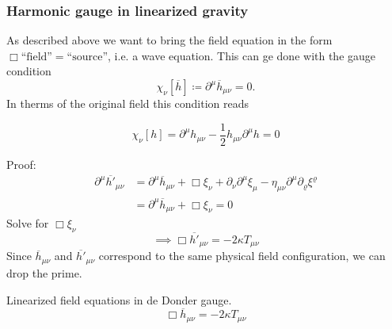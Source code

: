 \subsubsection{Harmonic gauge in linearized gravity}
As described above we want to bring the field equation in the form
$\Box\text{``field''}=\text{``source''}$, i.e. a wave equation.
This can ge done with the gauge condition
\begin{equation}
    \chi_\nu \left[ \overline{h} \right] \coloneqq \partial^\mu \overline{h}_{\mu\nu} = 0.
\end{equation}
In therms of the original field this condition reads
\begin{definition}
    \begin{equation}
        \chi_\nu \left[ h \right] = \partial^\mu h_{\mu\nu} - \frac{1}{2} h_{\mu\nu} \partial^\mu h = 0
    \end{equation}
\end{definition}
Proof:
\begin{equation}
    \begin{split}
        \partial^\mu \overline{h'}_{\mu\nu} &= \partial^\mu \overline{h}_{\mu\nu} + \Box \xi_\nu + \partial_\nu \partial^\mu \xi_\mu -
        \eta_{\mu\nu} \partial^\mu\partial_\varrho\xi^\varrho \\
        &= \partial^\mu \overline{h}_{\mu\nu} + \Box \xi_\nu = 0
    \end{split}
\end{equation}
Solve for $\Box\xi_\nu$
\begin{equation}
    \implies \Box \overline{h'}_{\mu\nu} = -2\kappa T_{\mu\nu}
\end{equation}
Since $\overline{h}_{\mu\nu}$ and $\overline{h'}_{\mu\nu}$ correspond to the same physical field configuration, we can drop the prime.
\begin{definition}{Linearized field equations in de Donder gauge.}
    \begin{equation}
        \Box \overline{h}_{\mu\nu} = - 2 \kappa T_{\mu\nu}
\end{equation}
\end{definition}
